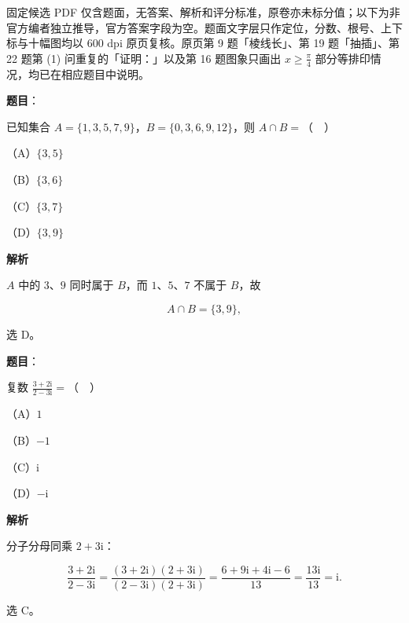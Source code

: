 

\begin{gktip}
固定候选 PDF 仅含题面，无答案、解析和评分标准，原卷亦未标分值；以下为非官方编者独立推导，官方答案字段为空。题面文字层只作定位，分数、根号、上下标与十幅图均以 600 dpi 原页复核。原页第 9 题「棱线长」、第 19 题「抽插」、第 22 题第 (1) 问重复的「证明：」以及第 16 题图象只画出 $x\geqslant\frac{\pi}{4}$ 部分等排印情况，均已在相应题目中说明。
\end{gktip}

\begin{answer}

\textbf{题目}：

已知集合 $A=\{1,3,5,7,9\}$，$B=\{0,3,6,9,12\}$，则 $A\cap B=$（　）

（A）$\{3,5\}$

（B）$\{3,6\}$

（C）$\{3,7\}$

（D）$\{3,9\}$

\textbf{解析}

$A$ 中的 $3$、$9$ 同时属于 $B$，而 $1$、$5$、$7$ 不属于 $B$，故

\nopagebreak[4]
\[A\cap B=\{3,9\},\]

选 D。


\end{answer}
\begin{answer}

\textbf{题目}：

复数 $\frac{3+2\mathrm i}{2-3\mathrm i}=$（　）

（A）$1$

（B）$-1$

（C）$\mathrm i$

（D）$-\mathrm i$

\textbf{解析}

分子分母同乘 $2+3\mathrm i$：

\nopagebreak[4]
\[\frac{3+2\mathrm i}{2-3\mathrm i}=\frac{(3+2\mathrm i)(2+3\mathrm i)}{(2-3\mathrm i)(2+3\mathrm i)}
=\frac{6+9\mathrm i+4\mathrm i-6}{13}=\frac{13\mathrm i}{13}=\mathrm i .\]

选 C。


\end{answer}
